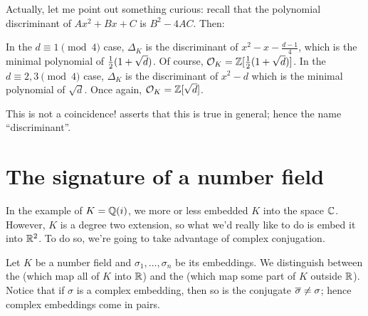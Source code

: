 Actually, let me point out something curious: recall that the polynomial discriminant of $Ax^2+Bx+C$ is $B^2-4AC$. Then:
\begin{itemize}
	\ii In the $d \equiv 1 \pmod 4$ case,
	$\Delta_K$ is the discriminant of $x^2 - x - \frac{d-1}{4}$,
	which is the minimal polynomial of $\frac{1}{2}(1+\sqrt d)$.
	Of course, $\mathcal O_K = \mathbb Z[\frac{1}{2}(1+\sqrt d)]$.
	\ii In the $d \equiv 2,3 \pmod 4$ case,
	$\Delta_K$ is the discriminant of $x^2 - d$
	which is the minimal polynomial of $\sqrt d$. Once again, $\mathcal O_K = \mathbb Z[\sqrt d]$.
\end{itemize}
This is not a coincidence!  asserts that this is true in general;
hence the name ``discriminant''.

\section{The signature of a number field}
In the example of $K = \mathbb Q(i)$,
we more or less embedded $K$ into the space $\mathbb C$.
However, $K$ is a degree two extension,
so what we'd really like to do is embed it into $\mathbb R^2$.
To do so, we're going to take advantage of complex conjugation.

Let $K$ be a number field and $\sigma_1, \dots, \sigma_n$ be its embeddings.
We distinguish between the 
(which map all of $K$ into $\mathbb R$)
and the  
(which map some part of $K$ outside $\mathbb R$).
Notice that if $\sigma$ is a complex embedding,
then so is the conjugate $\overline{\sigma} \ne \sigma$;
hence complex embeddings come in pairs.

